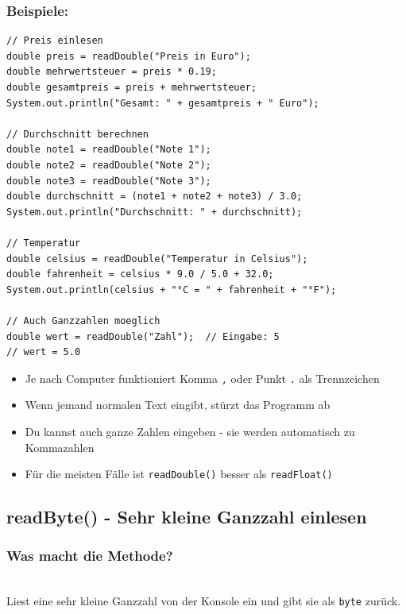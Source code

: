 \subsubsection*{Beispiele:}
\begin{lstlisting}
// Preis einlesen
double preis = readDouble("Preis in Euro");
double mehrwertsteuer = preis * 0.19;
double gesamtpreis = preis + mehrwertsteuer;
System.out.println("Gesamt: " + gesamtpreis + " Euro");

// Durchschnitt berechnen
double note1 = readDouble("Note 1");
double note2 = readDouble("Note 2");
double note3 = readDouble("Note 3");
double durchschnitt = (note1 + note2 + note3) / 3.0;
System.out.println("Durchschnitt: " + durchschnitt);

// Temperatur
double celsius = readDouble("Temperatur in Celsius");
double fahrenheit = celsius * 9.0 / 5.0 + 32.0;
System.out.println(celsius + "°C = " + fahrenheit + "°F");

// Auch Ganzzahlen moeglich
double wert = readDouble("Zahl");  // Eingabe: 5
// wert = 5.0
\end{lstlisting}

\begin{achtung}
	\begin{itemize}
		\item Je nach Computer funktioniert Komma \texttt{,} oder Punkt \texttt{.} als Trennzeichen
		\item Wenn jemand normalen Text eingibt, stürzt das Programm ab
		\item Du kannst auch ganze Zahlen eingeben - sie werden automatisch zu Kommazahlen
		\item Für die meisten Fälle ist \texttt{readDouble()} besser als \texttt{readFloat()}
	\end{itemize}
\end{achtung}

\newpage


\subsection*{readByte() - Sehr kleine Ganzzahl einlesen}

\subsubsection*{Was macht die Methode?}\\
Liest eine sehr kleine Ganzzahl von der Konsole ein und gibt sie als \texttt{byte} zurück.

